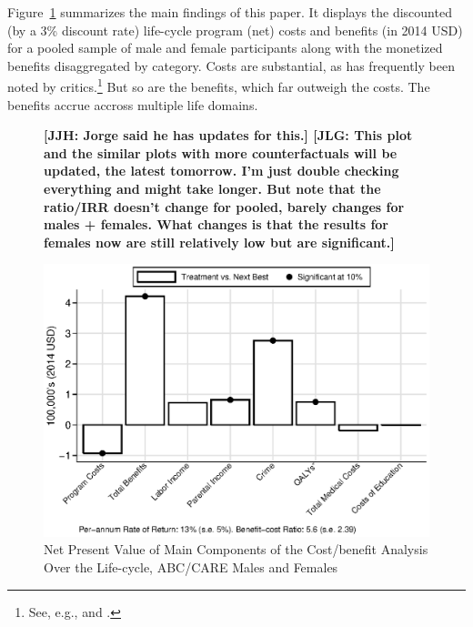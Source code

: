 Figure~\ref{figure:npvsall} summarizes the main findings of this paper. It displays the discounted (by a 3\% discount rate) life-cycle program (net) costs and benefits (in 2014 USD) for a pooled sample of male and female participants along with the monetized benefits disaggregated by category. Costs are substantial, as has frequently been noted by critics.\footnote{See, e.g., \citet{Whitehurst_2014_Senate_Testimony} and \citet{Fox_News_2014_Head_Start_Effects}.} But so are the benefits, which far outweigh the costs. The benefits accrue accross multiple life domains.

\begin{figure}
\textbf{[JJH: Jorge said he has updates for this.] [JLG: This plot and the similar plots with more counterfactuals will be updated, the latest tomorrow. I'm just double checking everything and might take longer. But note that the ratio/IRR doesn't change for pooled, barely changes for males + females. What changes is that the results for females now are still relatively low but are significant.]}
\caption{Net Present Value of Main Components of the Cost/benefit Analysis Over the Life-cycle, ABC/CARE Males and Females}
\label{figure:npvsall}
\centering
\includegraphics[width=.7\columnwidth]{output/abccare_npvssumm.eps}
\floatfoot{
\footnotesize
}
\end{figure}
